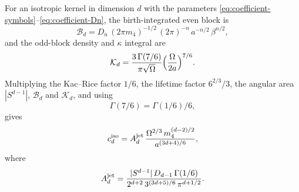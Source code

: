\begin{proposition}\label{prop:coefficient-iso}
For an isotropic kernel in dimension $d$ with the parameters \eqref{eq:coefficient-symbols}--\eqref{eq:coefficient-Dn}, the birth-integrated even block is
\begin{equation}\label{eq:coefficient-Bd}
\mathcal B_d=D_n\,(2\pi m_4)^{-1/2}\,(2\pi)^{-n}\,a^{-n/2}\,\beta^{n/2},
\end{equation}
and the odd-block density and $\kappa$ integral are
\begin{equation}\label{eq:coefficient-Kd}
\mathcal K_d=\frac{3\,\Gamma(7/6)}{\pi\sqrt\Omega}\Bigl(\frac{\Omega}{2a}\Bigr)^{7/6}.
\end{equation}
Multiplying the Kac--Rice factor $1/6$, the lifetime factor $6^{2/3}/3$, the angular area $|S^{d-1}|$, $\mathcal B_d$ and $\mathcal K_d$, and using
\begin{equation}\label{eq:coefficient-gamma76}
\Gamma(7/6)=\Gamma(1/6)/6,
\end{equation}
gives
\begin{equation}\label{eq:coefficient-ciso}
c_d^{\rm iso}=A_d^{\rm jet}\,\frac{\Omega^{2/3}\,m_4^{(d-2)/2}}{a^{(3d+4)/6}},
\end{equation}
where
\begin{equation}\label{eq:coefficient-Ajet}
A_d^{\rm jet}=\frac{|S^{d-1}|\,D_{d-1}\,\Gamma(1/6)}{2^{d+2}\,3^{(3d+5)/6}\,\pi^{d+1/2}} .
\end{equation}
\end{proposition}

